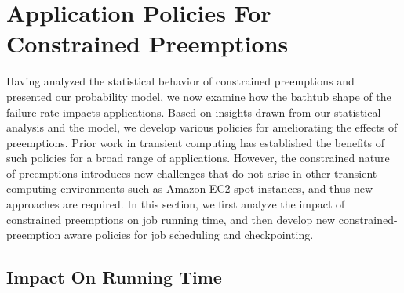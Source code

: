 \vspace*{\subsecspace}
\section{Application Policies For Constrained Preemptions}
\label{sec:policies}
Having analyzed the statistical behavior of constrained preemptions and presented our probability model, we now examine how the bathtub shape of the failure rate impacts applications. 
Based on insights drawn from our statistical analysis and the model, we develop various policies for ameliorating the effects of preemptions. 
Prior work in transient computing has established the benefits of such policies for a broad range of applications. 
However, the constrained nature of preemptions introduces new challenges that do not arise in other transient computing environments such as Amazon EC2 spot instances, and thus new approaches are required. 
In this section, we first analyze the impact of constrained preemptions on job running time, and then develop new constrained-preemption aware policies for job scheduling and checkpointing. 







\vspace*{\subsecspace}
\subsection{Impact On Running Time}

